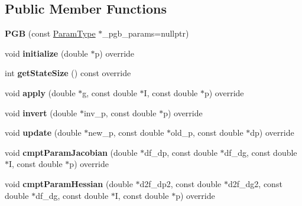 \subsection*{Public Member Functions}
\begin{DoxyCompactItemize}
\item 
\hypertarget{classPGB_ad5478be9619d269f03b721ef79706e39}{{\bfseries P\-G\-B} (const \hyperlink{structPGBParams}{Param\-Type} $\ast$\-\_\-pgb\-\_\-params=nullptr)}\label{classPGB_ad5478be9619d269f03b721ef79706e39}

\item 
\hypertarget{classPGB_a417e85e1224db09f90bc0023fe951920}{void {\bfseries initialize} (double $\ast$p) override}\label{classPGB_a417e85e1224db09f90bc0023fe951920}

\item 
\hypertarget{classPGB_a8bfdd5508674d0ebb74b24a3804cd00c}{int {\bfseries get\-State\-Size} () const override}\label{classPGB_a8bfdd5508674d0ebb74b24a3804cd00c}

\item 
\hypertarget{classPGB_a7f2f85646d84c71913f0476eecaacb2f}{void {\bfseries apply} (double $\ast$g, const double $\ast$I, const double $\ast$p) override}\label{classPGB_a7f2f85646d84c71913f0476eecaacb2f}

\item 
\hypertarget{classPGB_a0a3065d1437ffef8e418515cc8bcc033}{void {\bfseries invert} (double $\ast$inv\-\_\-p, const double $\ast$p) override}\label{classPGB_a0a3065d1437ffef8e418515cc8bcc033}

\item 
\hypertarget{classPGB_ae4195eca099d591500ddc65d2d3f34ca}{void {\bfseries update} (double $\ast$new\-\_\-p, const double $\ast$old\-\_\-p, const double $\ast$dp) override}\label{classPGB_ae4195eca099d591500ddc65d2d3f34ca}

\item 
\hypertarget{classPGB_a2b9a8cc854588e7cae6762727e1afd38}{void {\bfseries cmpt\-Param\-Jacobian} (double $\ast$df\-\_\-dp, const double $\ast$df\-\_\-dg, const double $\ast$I, const double $\ast$p) override}\label{classPGB_a2b9a8cc854588e7cae6762727e1afd38}

\item 
\hypertarget{classPGB_a8bc5d229bf77233375196aec8f4c0048}{void {\bfseries cmpt\-Param\-Hessian} (double $\ast$d2f\-\_\-dp2, const double $\ast$d2f\-\_\-dg2, const double $\ast$df\-\_\-dg, const double $\ast$I, const double $\ast$p) override}\label{classPGB_a8bc5d229bf77233375196aec8f4c0048}


\end{DoxyCompactItemize}

